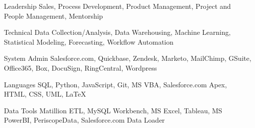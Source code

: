 


\begin{cvskills}

\cvskill
{Leadership} %
{Sales, Process Development, Product Management, Project and People Management, Mentorship} %


\cvskill
{Technical} %
{Data Collection/Analysis, Data Warehousing, Machine Learning, Statistical Modeling, Forecasting, Workflow Automation} %


\cvskill
{System Admin} %
{Salesforce.com, Quickbase, Zendesk, Marketo, MailChimp, GSuite, Office365, Box, DocuSign, RingCentral, Wordpress} %


\cvskill
{Languages} %
{SQL, Python, JavaScript, Git, MS VBA, Salesforce.com Apex, HTML, CSS, UML, \LaTeX } %


\cvskill
{Data Tools} %
{Matillion ETL, MySQL Workbench, MS Excel, Tableau, MS PowerBI, PeriscopeData, Salesforce.com Data Loader} %

\end{cvskills}